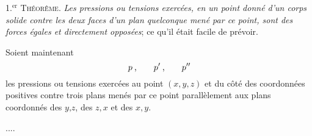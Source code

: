 \documentclass[11pt, twoside, leqno]{article}
\begin{document}
1.${^{\text{er}}}$ \textsc{Théorême}. \emph{Les pressions ou tensions exercées, en un point donné d'un corps solide contre les deux faces d'un plan quelconque mené par ce point, sont des forces égales et directement opposées}\hspace{.2ex}; ce qu'il était facile de prévoir.

Soient maintenant
\begin{equation}
p
\hspace{.5ex} \text{,} \hspace{2em}
p'
\hspace{.5ex} \text{,} \hspace{2em}
p''
\end{equation}
les pressions ou tensions exercées au point \;$(x, y, z)$\; et du côté des coordonnées positives contre trois plans menés par ce point parallèlement aux plans coordonnés des \;$y\text{,} z$\;, des \;$z, x$\; et des \;$x, y$\;.

....
\end{document}
